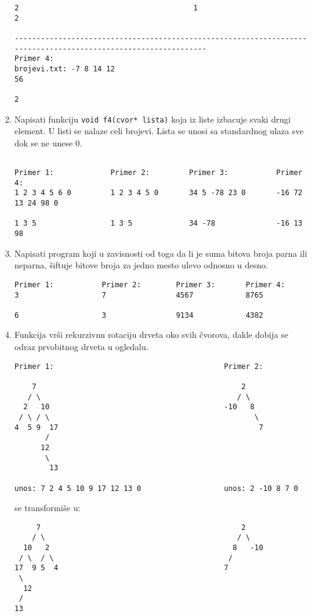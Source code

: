 \begin{enumerate}
\begin{verbatim}
2                                        1                               2

---------------------------------------------------------------------------------------------------------------
Primer 4:
brojevi.txt: -7 8 14 12
56

2
\end{verbatim}


\item Napisati funkciju \verb|void f4(cvor* lista)| koja iz liste izbacuje svaki drugi element.
U listi se nalaze celi brojevi. Lista se unosi sa standardnog ulaza sve dok se ne unese 0.

\begin{verbatim}

Primer 1:             Primer 2:         Primer 3:           Primer 4:
1 2 3 4 5 6 0         1 2 3 4 5 0       34 5 -78 23 0       -16 72 13 24 98 0

1 3 5                 1 3 5             34 -78              -16 13 98
\end{verbatim}



\item Napisati program koji u zavisnosti od toga da li je suma bitova broja parna ili neparna,
\v siftuje bitove broja za jedno mesto ulevo odnosno u desno.

\begin{verbatim}
Primer 1:           Primer 2:        Primer 3:       Primer 4:
3                   7                4567            8765

6                   3                9134            4382
\end{verbatim}


\item Funkcija vr\v si rekurzivnu rotaciju drveta oko svih \v cvorova,
dakle dobija se odraz prvobitnog drveta u ogledalu.
\begin{verbatim}
Primer 1:                                       Primer 2:

    7                                               2
   / \                                             / \
  2   10                                        -10   8
 / \ / \                                               \
4  5 9  17                                              7
       /
      12
       \
        13

unos: 7 2 4 5 10 9 17 12 13 0                   unos: 2 -10 8 7 0
\end{verbatim}
se transformi\v se u:
\begin{verbatim}
     7                                              2
    / \                                            / \
  10   2                                          8   -10
 / \  / \                                        /
17  9 5  4                                      7
 \
  12
 /
13


\end{verbatim}
\end{enumerate}
